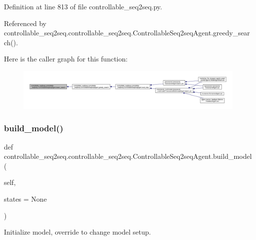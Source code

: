 Definition at line 813 of file controllable\+\_\+seq2seq.\+py.



Referenced by controllable\+\_\+seq2seq.\+controllable\+\_\+seq2seq.\+Controllable\+Seq2seq\+Agent.\+greedy\+\_\+search().

Here is the caller graph for this function\+:
\nopagebreak
\begin{figure}[H]
\begin{center}
\leavevmode
\includegraphics[width=350pt]{classcontrollable__seq2seq_1_1controllable__seq2seq_1_1ControllableSeq2seqAgent_a9de6e4414354c8e879ea51231e44242e_icgraph}
\end{center}
\end{figure}
\mbox{\label{classcontrollable__seq2seq_1_1controllable__seq2seq_1_1ControllableSeq2seqAgent_a7341b7dedc7150c4dfa27254188360c1}} 
\subsubsection{\texorpdfstring{build\+\_\+model()}{build\_model()}}
{\footnotesize\ttfamily def controllable\+\_\+seq2seq.\+controllable\+\_\+seq2seq.\+Controllable\+Seq2seq\+Agent.\+build\+\_\+model (\begin{DoxyParamCaption}\item[{}]{self,  }\item[{}]{states = {\ttfamily None} }\end{DoxyParamCaption})}

\begin{DoxyVerb}Initialize model, override to change model setup.\end{DoxyVerb}
 

